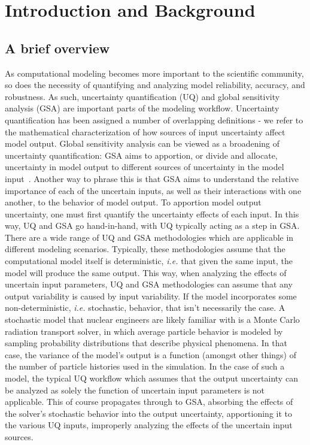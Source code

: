 
\chapter{Introduction and Background} \label{ch-introduction}
\section{A brief overview}\label{sec:overview}
As computational modeling becomes more important to the scientific community, so does the necessity of quantifying and analyzing model reliability, accuracy, and robustness. As such, uncertainty quantification (UQ) and global sensitivity analysis (GSA) are important parts of the modeling workflow. Uncertainty quantification has been assigned a number of overlapping definitions - we refer to the mathematical characterization of how sources of input uncertainty affect model output. Global sensitivity analysis can be viewed as a broadening of uncertainty quantification: GSA aims to apportion, or divide and allocate, uncertainty in model output to different sources of uncertainty in the model input~\cite{saltelli2004}. Another way to phrase this is that GSA aims to understand the relative importance of each of the uncertain inputs, as well as their interactions with one another, to the behavior of model output. To apportion model output uncertainty, one must first quantify the uncertainty effects of each input. In this way, UQ and GSA go hand-in-hand, with UQ typically acting as a step in GSA. 
There are a wide range of UQ and GSA methodologies which are applicable in different modeling scenarios. Typically, these methodologies assume that the computational model itself is deterministic, \textit{i.e.} that given the same input, the model will produce the same output. This way, when analyzing the effects of uncertain input parameters, UQ and GSA methodologies can assume that any output variability is caused by input variability. If the model incorporates some non-deterministic, \textit{i.e.} stochastic, behavior, that isn't necessarily the case. A stochastic model that nuclear engineers are likely familiar with is a Monte Carlo radiation transport solver, in which average particle behavior is modeled by sampling probability distributions that describe physical phenomena. In that case, the variance of the model's output is a function (amongst other things) of the number of particle histories used in the simulation. In the case of such a model, the typical UQ workflow which assumes that the output uncertainty can be analyzed as solely the function of uncertain input parameters is not applicable. This of course propagates through to GSA, absorbing the effects of the solver's stochastic behavior into the output uncertainty, apportioning it to the various UQ inputs, improperly analyzing the effects of the uncertain input sources. 

